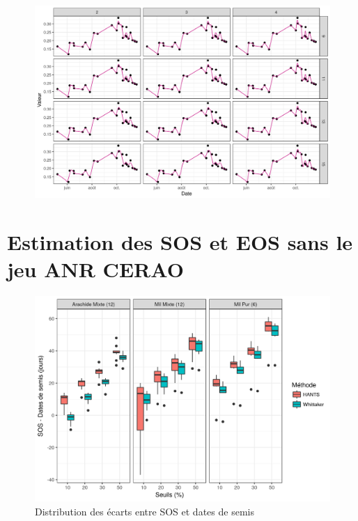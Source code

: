 \begin{figure}[htbp]
 \begin{center}
  \includegraphics[scale=0.7]{annexes/savgol_prs_3.png} 
 \end{center}
\end{figure}

\chapter{Estimation des SOS et EOS sans le jeu ANR CERAO}\label{annexe-c}

\begin{figure}[htbp]
 \begin{center}
  \includegraphics[scale=0.8]{annexes/SOS_Boxplot_Oracle.png} 
 \end{center}
 \caption*{Distribution des écarts entre SOS et dates de semis}
\end{figure}

